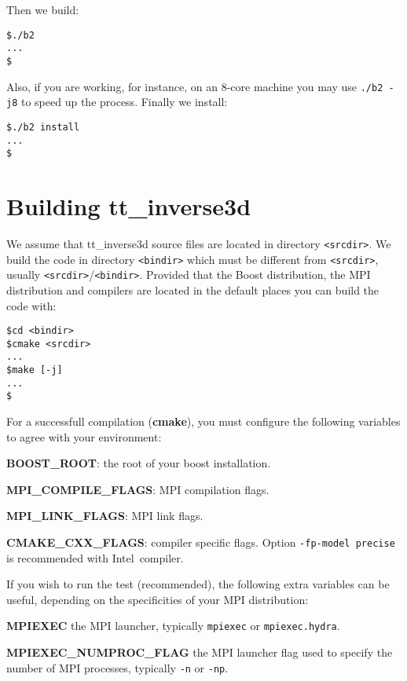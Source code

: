 \documentclass[twoside,final,onecolumn]{article}
\newcommand{\intel}{Intel\textregistered}
\begin{document}
Then we build:
\begin{framed}
\begin{verbatim}
$./b2
...
$
\end{verbatim}
\end{framed}
Also, if you are working, for instance, on an 8-core machine you may use \verb+./b2 -j8+  to speed up the process. Finally we install:
\begin{framed}
\begin{verbatim}
$./b2 install
...
$
\end{verbatim}
\end{framed}

\section{Building tt\_inverse3d}

We assume that tt\_inverse3d source files are located in directory \verb+<srcdir>+.
We build the code in directory \verb+<bindir>+ which must be different from \verb+<srcdir>+, usually \verb+<srcdir>+/\verb+<bindir>+.
Provided that the Boost distribution, the MPI distribution and compilers are located in the default places you can build the code with:

\begin{framed}
\begin{verbatim}
$cd <bindir>
$cmake <srcdir>
...
$make [-j]
...
$
\end{verbatim}
\end{framed}

For a successfull compilation ({\bf{cmake}}), you must configure the following variables to agree with your environment:

\begin{description}
\item{\bf BOOST\_ROOT}: the root of your boost installation.
\item{\bf MPI\_COMPILE\_FLAGS}: MPI compilation flags.
\item{\bf MPI\_LINK\_FLAGS}: MPI link flags.
\item{\bf CMAKE\_CXX\_FLAGS}: compiler specific flags. Option {\tt -fp-model precise} is recommended with \intel\ compiler.
\end{description}

If you wish to run the test (recommended), the following extra variables can be useful, depending on the specificities of your MPI distribution:

\begin{description}
\item{\bf MPIEXEC} the MPI launcher, typically {\tt mpiexec} or {\tt mpiexec.hydra}.
\item{\bf MPIEXEC\_NUMPROC\_FLAG} the MPI launcher flag used to specify the number of MPI processes, typically {\tt -n} or {\tt -np}.
\end{description}
\end{document}
